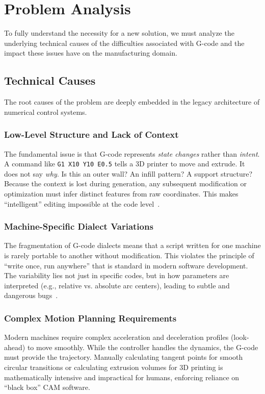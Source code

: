 \section{Problem Analysis}

To fully understand the necessity for a new solution, we must analyze the underlying technical causes of the difficulties associated with G-code and the impact these issues have on the manufacturing domain.

\subsection{Technical Causes}

The root causes of the problem are deeply embedded in the legacy architecture of numerical control systems.

\subsubsection{Low-Level Structure and Lack of Context}
The fundamental issue is that G-code represents \textit{state changes} rather than \textit{intent}. A command like \texttt{G1 X10 Y10 E0.5} tells a 3D printer to move and extrude. It does not say \textit{why}. Is this an outer wall? An infill pattern? A support structure? Because the context is lost during generation, any subsequent modification or optimization must infer distinct features from raw coordinates. This makes ``intelligent'' editing impossible at the code level~\cite{abdelaal_gllm_2025}.

\subsubsection{Machine-Specific Dialect Variations}
The fragmentation of G-code dialects means that a script written for one machine is rarely portable to another without modification. This violates the principle of ``write once, run anywhere'' that is standard in modern software development. The variability lies not just in specific codes, but in how parameters are interpreted (e.g., relative vs. absolute arc centers), leading to subtle and dangerous bugs~\cite{noauthor_secrets_nodate}.

\subsubsection{Complex Motion Planning Requirements}
Modern machines require complex acceleration and deceleration profiles (look-ahead) to move smoothly. While the controller handles the dynamics, the G-code must provide the trajectory. Manually calculating tangent points for smooth circular transitions or calculating extrusion volumes for 3D printing is mathematically intensive and impractical for humans, enforcing reliance on ``black box'' CAM software.

